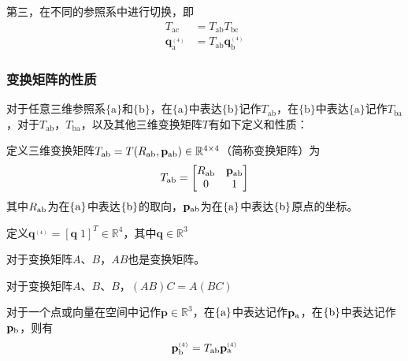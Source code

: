 \documentclass[12pt, a4paper, article, UTF8]{ctexart}
\begin{document}
第三，在不同的参照系中进行切换，即
\begin{align}
T_\text{ac} &= T_\text{ab}T_\text{bc} \\
\mathbf{q}_\text{a}^{{}_{(4)}} &= T_\text{ab} \mathbf{q}_\text{b}^{{}_{(4)}}
\end{align}

\subsubsection{变换矩阵的性质}
对于任意三维参照系$\{\text{a}\}$和$\{\text{b}\}$，在$\{\text{a}\}$中表达$\{\text{b}\}$记作$T_\text{ab}$，在$\{\text{b}\}$中表达$\{\text{a}\}$记作$T_\text{ba}$，对于$T_\text{ab}$，$T_\text{ba}$，以及其他三维变换矩阵$T$有如下定义和性质：
\begin{mydefinition}
定义三维变换矩阵$T_\textnormal{ab} = T(R_\textnormal{ab}, \mathbf{p}_\textnormal{ab})\in\mathbb{R}^{4\times 4}$（简称变换矩阵）为
\begin{align*}
T_\textnormal{ab}=\begin{bmatrix}
R_\textnormal{ab} & \mathbf{p}_\textnormal{ab} \\
0 & 1
\end{bmatrix}
\end{align*}
其中$R_\textnormal{ab}$为在$\{\textnormal{a}\}$中表达$\{\textnormal{b}\}$的取向，$\mathbf{p}_\textnormal{ab}$为在$\{\textnormal{a}\}$中表达$\{\textnormal{b}\}$原点的坐标。
\end{mydefinition}

\begin{mydefinition}
定义$\mathbf{q}^{{}_{(4)}} = [\mathbf{q} \; 1]^T\in \mathbb{R}^4$，其中$\mathbf{q}\in\mathbb{R}^3$
\end{mydefinition}

\begin{mytheorem}
对于变换矩阵$A$、$B$，$AB$也是变换矩阵。
\end{mytheorem}

\begin{mytheorem}
对于变换矩阵$A$、$B$、$B$，$(AB)C = A(BC)$
\end{mytheorem}

\begin{mytheorem}
对于一个点或向量在空间中记作$\mathbf{p}\in\mathbb{R}^3$，在$\{\textnormal{a}\}$中表达记作$\mathbf{p}_\textnormal{a}$，在$\{\textnormal{b}\}$中表达记作$\mathbf{p}_\textnormal{b}$，则有
\begin{align*}
\mathbf{p}_\textnormal{b}^{{}_{(4)}} = T_\textnormal{ab}\mathbf{p}_\textnormal{a}^{{}_{(4)}}
\end{align*}

\end{mytheorem}
\end{document}
